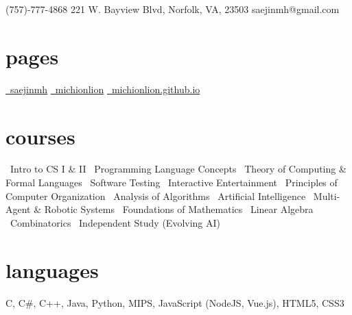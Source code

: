 \documentclass[]{friggeri-cv}
\begin{document}
       {\faMobilePhone\hspace{1mm}(757)-777-4868 \hspace{1cm} 221 W. Bayview Blvd, Norfolk, VA, 23503 \hspace{1.5cm} \faEnvelope\hspace{1.5mm}saejinmh@gmail.com}

\begin{aside}
  \section{pages}\vspace{0.05cm}
    \href{https://www.linkedin.com/in/saejinmh}{\faLinkedin\ saejinmh}\vspace{0.03cm}
    \href{https://github.com/Michionlion}{\faGithub\ michionlion}\vspace{0.03cm}
    \href{https://michionlion.github.io}{\faGlobe\ michionlion.github.io}\vspace{0.03cm}
  \section{courses}\vspace{0.05cm}
	\bullet\ Intro to CS I \& II\vspace{0.1cm}
	\bullet\ Programming Language Concepts\vspace{0.1cm}
	\bullet\ Theory of Computing \& Formal Languages\vspace{0.1cm}	
	\bullet\ Software Testing\vspace{0.1cm}
	\bullet\ Interactive Entertainment\vspace{0.1cm}
	\bullet\ Principles of Computer Organization\vspace{0.1cm}
	\bullet\ Analysis of Algorithms\vspace{0.1cm}
	\bullet\ Artificial Intelligence\vspace{0.1cm}
	\bullet\ Multi-Agent \& Robotic Systems\vspace{0.1cm}
	\bullet\ Foundations of Mathematics\vspace{0.1cm}
	\bullet\ Linear Algebra\vspace{0.1cm}
	\bullet\ Combinatorics\vspace{0.1cm}
	\bullet\ Independent Study (Evolving AI)\vspace{0.1cm}
  \section{languages}\vspace{0.05cm}
    C, C\#, C++, Java, Python, MIPS, JavaScript (NodeJS, Vue.js), HTML5, CSS3\vspace{0.1cm}

\end{aside}
\end{document}

